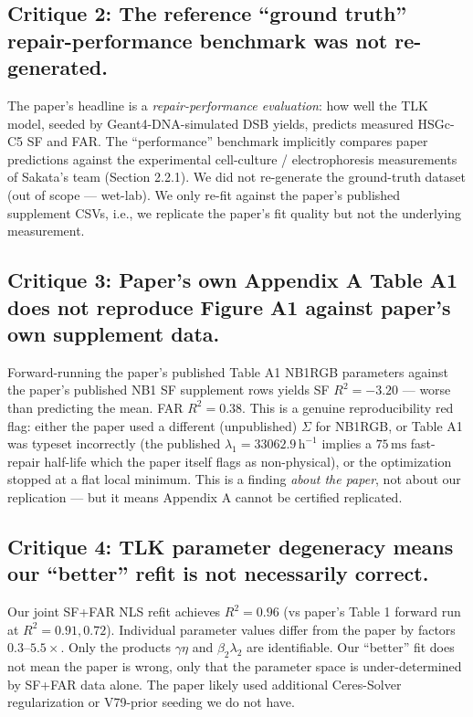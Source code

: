 \documentclass[11pt]{article}
\begin{document}
\subsection*{Critique 2: The reference ``ground truth'' repair-performance benchmark was not re-generated.}
The paper's headline is a \emph{repair-performance evaluation}: how well the
TLK model, seeded by Geant4-DNA-simulated DSB yields, predicts measured
HSGc-C5 SF and FAR. The ``performance'' benchmark implicitly compares
paper predictions against the experimental cell-culture / electrophoresis
measurements of Sakata's team (Section 2.2.1). We did not re-generate the
ground-truth dataset (out of scope --- wet-lab). We only re-fit against the
paper's published supplement CSVs, i.e., we replicate the paper's fit
quality but not the underlying measurement.

\subsection*{Critique 3: Paper's own Appendix A Table A1 does not reproduce Figure A1 against paper's own supplement data.}
Forward-running the paper's published Table A1 NB1RGB parameters against the
paper's published NB1 SF supplement rows yields SF $R^2 = -3.20$ --- worse than
predicting the mean. FAR $R^2 = 0.38$. This is a genuine reproducibility red
flag: either the paper used a different (unpublished) $\Sigma$ for NB1RGB, or
Table A1 was typeset incorrectly (the published $\lambda_1{=}33062.9\,\mathrm{h}^{-1}$
implies a $75\,\mathrm{ms}$ fast-repair half-life which the paper itself flags as
non-physical), or the optimization stopped at a flat local minimum. This is a
finding \emph{about the paper}, not about our replication --- but it means
Appendix A cannot be certified replicated.

\subsection*{Critique 4: TLK parameter degeneracy means our ``better'' refit is not necessarily correct.}
Our joint SF+FAR NLS refit achieves $R^2{=}0.96$ (vs paper's Table 1 forward run
at $R^2{=}0.91,0.72$). Individual parameter values differ from the paper by
factors $0.3\text{--}5.5\times$. Only the products $\gamma\eta$ and $\beta_2\lambda_2$
are identifiable. Our ``better'' fit does not mean the paper is wrong, only that
the parameter space is under-determined by SF+FAR data alone. The paper likely
used additional Ceres-Solver regularization or V79-prior seeding we do not have.
\end{document}
